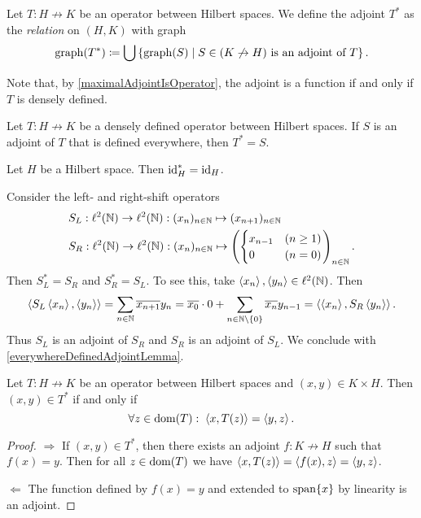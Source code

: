 \begin{definition}
Let $T: H\not\to K$ be an operator between Hilbert spaces. We define the adjoint $T^*$ as the \emph{relation} on $(H,K)$ with graph
\[ \operatorname{graph}(T^*) \coloneqq \bigcup\left\{ \operatorname{graph}(S) \;\middle|\; \text{$S\in (K\not\to H)$ is an adjoint of $T$} \right\}. \]
\end{definition}
Note that, by \ref{maximalAdjointIsOperator}, the adjoint is a function if and only if $T$ is densely defined.

\begin{lemma} \label{everywhereDefinedAdjointLemma}
Let $T: H\not\to K$ be a densely defined operator between Hilbert spaces. If $S$ is an adjoint of $T$ that is defined everywhere, then $T^* = S$.
\end{lemma}
\begin{corollary}
Let $H$ be a Hilbert space. Then $\operatorname{id}_H^* = \operatorname{id}_H$.
\end{corollary}

\begin{example}
Consider the left- and right-shift operators
\begin{align*}
&S_L: \ell^2(\mathbb{N}) \to \ell^2(\mathbb{N}): (x_n)_{n\in\mathbb{N}} \mapsto (x_{n+1})_{n\in\mathbb{N}} \\
&S_R: \ell^2(\mathbb{N}) \to \ell^2(\mathbb{N}): (x_n)_{n\in\mathbb{N}} \mapsto \left(\begin{cases}
x_{n-1} & (n\geq 1) \\ 0 &(n=0)
\end{cases}\right)_{n\in \mathbb{N}}.
\end{align*}
Then $S_L^* = S_R$ and $S_R^* = S_L$. To see this, take $\left\langle x_n \right\rangle, \left\langle y_n \right\rangle\in \ell^2(\mathbb{N})$. Then
\[ \left\langle S_L\left\langle x_n \right\rangle, \left\langle y_n \right\rangle \right\rangle = \sum_{n\in\mathbb{N}}\overline{x_{n+1}}y_n = \overline{x_0}\cdot 0 + \sum_{n\in\mathbb{N}\setminus\{0\}}\overline{x_{n}}y_{n-1} = \left\langle \left\langle x_n \right\rangle, S_R\left\langle y_n \right\rangle \right\rangle. \]
Thus $S_L$ is an adjoint of $S_R$ and $S_R$ is an adjoint of $S_L$. We conclude with \ref{everywhereDefinedAdjointLemma}.
\end{example}

\begin{lemma} \label{adjointRelationLemma}
Let $T: H\not\to K$ be an operator between Hilbert spaces and $(x,y)\in K\times H$. Then $(x, y)\in T^*$ \textup{if and only if}
\[ \forall z\in\operatorname{dom}(T): \; \left\langle x, T(z) \right\rangle = \left\langle y, z \right\rangle. \]
\end{lemma}
\begin{proof}
$\boxed{\Rightarrow}$ If $(x, y)\in T^*$, then there exists an adjoint $f: K\not\to H$ such that $f(x) = y$. Then for all $z\in \operatorname{dom}(T)$ we have $\left\langle x, T(z) \right\rangle = \left\langle f(x), z \right\rangle = \left\langle y, z \right\rangle$.

$\boxed{\Leftarrow}$ The function defined by $f(x) = y$ and extended to $\operatorname{span}\{x\}$ by linearity is an adjoint.
\end{proof}

